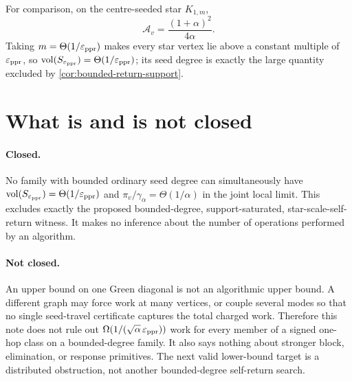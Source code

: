\documentclass[11pt]{article}
\begin{document}
For comparison, on the centre-seeded star $K_{1,m}$,
\begin{equation}
 \mathcal A_v=\frac{(1+\alpha)^2}{4\alpha}.
 \label{eq:bounded-return-star}
\end{equation}
Taking $m=\Theta(1/\varepsilon_{\mathrm{ppr}})$ makes every star vertex lie above a constant
multiple of $\varepsilon_{\mathrm{ppr}}$, so
$\operatorname{vol}(S_{\varepsilon_{\mathrm{ppr}}})=\Theta(1/\varepsilon_{\mathrm{ppr}})$; its seed degree is exactly the large
quantity excluded by \cref{cor:bounded-return-support}.

\section{What is and is not closed}
\label{sec:bounded-return-scope-limit}

\paragraph{Closed.}
No family with bounded ordinary seed degree can simultaneously have
$\operatorname{vol}(S_{\varepsilon_{\mathrm{ppr}}})=\Theta(1/\varepsilon_{\mathrm{ppr}})$ and
$\pi_v/\gamma_{\alpha}=\Theta(1/\alpha)$ in the joint local limit.  This
excludes exactly the proposed bounded-degree, support-saturated,
star-scale-self-return witness.  It makes no inference about the number of
operations performed by an algorithm.

\paragraph{Not closed.}
An upper bound on one Green diagonal is not an algorithmic upper bound.  A
different graph may force work at many vertices, or couple several modes so
that no single seed-travel certificate captures the total charged work.
Therefore this note does not rule out
$\Omega(1/(\sqrt\alpha\,\varepsilon_{\mathrm{ppr}}))$ work for every member of a signed one-hop
class on a bounded-degree family.  It also says nothing about stronger block,
elimination, or response primitives.  The next valid lower-bound target is a
distributed obstruction, not another bounded-degree self-return search.
\end{document}
